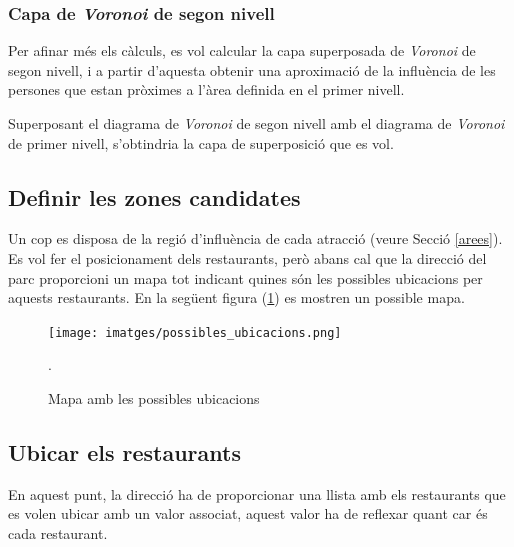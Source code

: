 \documentclass[12pt]{article}
\begin{document}
\subsubsection{Capa de \textit{Voronoi} de segon nivell}
Per afinar més els càlculs, es vol calcular la capa superposada de \textit{Voronoi} de segon nivell, i a partir d'aquesta obtenir una aproximació de la influència de les persones que estan pròximes a l'àrea definida en el primer nivell.



Superposant el diagrama de \textit{Voronoi} de segon nivell amb el diagrama de \textit{Voronoi} de primer nivell, s'obtindria la capa de superposició que es vol.



\subsection{Definir les zones candidates}
Un cop es disposa de la regió d'influència de cada atracció (veure Secció \ref{arees}). Es vol fer el posicionament dels restaurants, però abans cal que la direcció del parc proporcioni un mapa tot indicant quines són les possibles ubicacions per aquests restaurants. En la següent figura (\ref{fig:zones_candidates}) es mostren un possible mapa.

\begin{figure}[H]
	\centering
	\texttt{[image: imatges/possibles\_ubicacions.png]}\par\vspace{1cm}
	\caption{Mapa amb les possibles ubicacions}.
	\label{fig:zones_candidates}
\end{figure}

\subsection{Ubicar els restaurants}
En aquest punt, la direcció ha de proporcionar una llista amb els restaurants que es volen ubicar amb un valor associat, aquest valor ha de reflexar quant car és cada restaurant.
\end{document}
